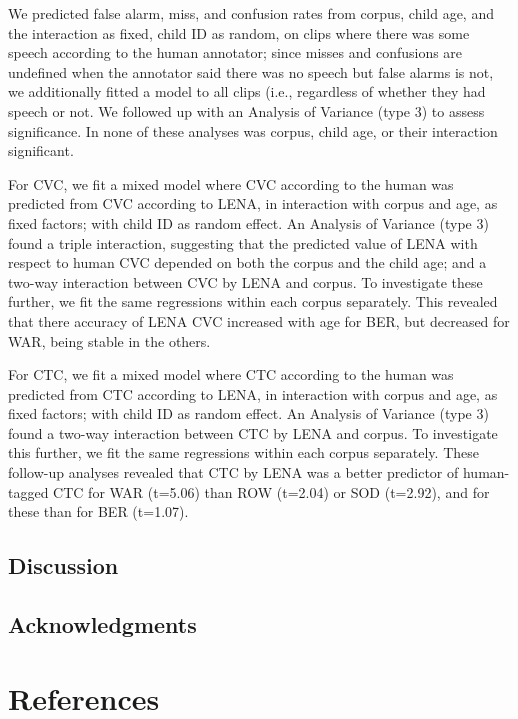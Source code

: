\documentclass[english,floatsintext,man]{apa6}
\begin{document}
We predicted false alarm, miss, and confusion rates from corpus, child
age, and the interaction as fixed, child ID as random, on clips where
there was some speech according to the human annotator; since misses and
confusions are undefined when the annotator said there was no speech but
false alarms is not, we additionally fitted a model to all clips (i.e.,
regardless of whether they had speech or not. We followed up with an
Analysis of Variance (type 3) to assess significance. In none of these
analyses was corpus, child age, or their interaction significant.

For CVC, we fit a mixed model where CVC according to the human was
predicted from CVC according to LENA, in interaction with corpus and
age, as fixed factors; with child ID as random effect. An Analysis of
Variance (type 3) found a triple interaction, suggesting that the
predicted value of LENA with respect to human CVC depended on both the
corpus and the child age; and a two-way interaction between CVC by LENA
and corpus. To investigate these further, we fit the same regressions
within each corpus separately. This revealed that there accuracy of LENA
CVC increased with age for BER, but decreased for WAR, being stable in
the others.

For CTC, we fit a mixed model where CTC according to the human was
predicted from CTC according to LENA, in interaction with corpus and
age, as fixed factors; with child ID as random effect. An Analysis of
Variance (type 3) found a two-way interaction between CTC by LENA and
corpus. To investigate this further, we fit the same regressions within
each corpus separately. These follow-up analyses revealed that CTC by
LENA was a better predictor of human-tagged CTC for WAR (t=5.06) than
ROW (t=2.04) or SOD (t=2.92), and for these than for BER (t=1.07).

\subsection{Discussion}\label{discussion}

\subsection{Acknowledgments}\label{acknowledgments}

\newpage

\section{References}\label{references}

\setlength{\parindent}{-0.5in} \setlength{\leftskip}{0.5in}
\end{document}
